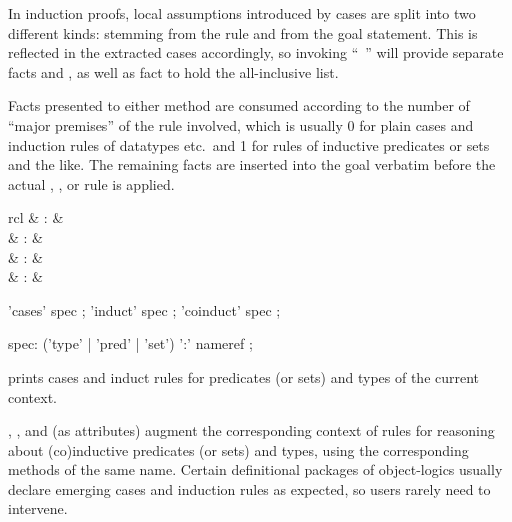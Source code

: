 \begin{isabellebody}
\begin{isamarkuptext}
  In induction proofs, local assumptions introduced by cases are split
  into two different kinds:  stemming from the rule and
   from the goal statement.  This is reflected in the
  extracted cases accordingly, so invoking ``\mbox{}~'' will provide separate facts  and ,
  as well as fact  to hold the all-inclusive list.

  \medskip Facts presented to either method are consumed according to
  the number of ``major premises'' of the rule involved, which is
  usually 0 for plain cases and induction rules of datatypes etc.\ and
  1 for rules of inductive predicates or sets and the like.  The
  remaining facts are inserted into the goal verbatim before the
  actual , , or  rule is
  applied.%
\end{isamarkuptext}%
\isamarkuptrue%
%
\isamarkuptrue%
%
\begin{isamarkuptext}%
\begin{matharray}{rcl}
    \mbox{}\isa{{\isachardoublequote}\isactrlsup {\isacharasterisk}{\isachardoublequote}} & : &  \\
    \mbox{} & : & \isaratt \\
    \mbox{} & : & \isaratt \\
    \mbox{} & : & \isaratt \\
  \end{matharray}

  \begin{rail}
    'cases' spec
    ;
    'induct' spec
    ;
    'coinduct' spec
    ;

    spec: ('type' | 'pred' | 'set') ':' nameref
    ;
  \end{rail}

  \begin{descr}

  \item [\mbox{\isa{\isacommand{print{\isacharunderscore}induct{\isacharunderscore}rules}}}] prints cases and induct
  rules for predicates (or sets) and types of the current context.
  
  \item [\mbox{\isa{cases}}, \mbox{\isa{induct}}, and \mbox{\isa{coinduct}}] (as attributes) augment the corresponding context of
  rules for reasoning about (co)inductive predicates (or sets) and
  types, using the corresponding methods of the same name.  Certain
  definitional packages of object-logics usually declare emerging
  cases and induction rules as expected, so users rarely need to
  intervene.
  

\end{descr}
\end{isamarkuptext}
\end{isabellebody}
